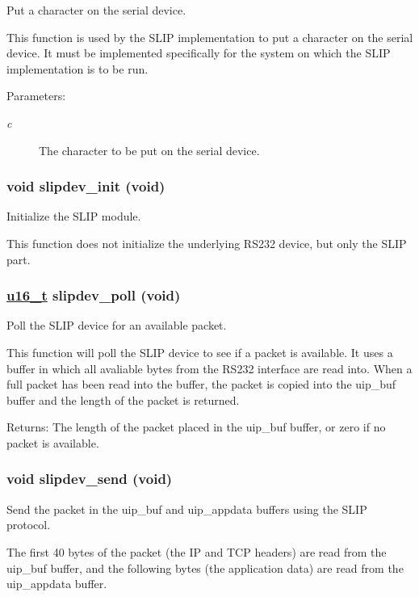Put a character on the serial device. 

This function is used by the SLIP implementation to put a character on the serial device. It must be implemented specifically for the system on which the SLIP implementation is to be run.

\begin{Desc}
\item[Parameters:]
\begin{description}
\item[{\em c}]The character to be put on the serial device. \end{description}
\end{Desc}
\hypertarget{a00068_g24cdb292a83c88750cdc170546038d0d}{
\subsubsection[slipdev\_\-init]{\setlength{\rightskip}{0pt plus 5cm}void slipdev\_\-init (void)}}
\label{a00068_g24cdb292a83c88750cdc170546038d0d}


Initialize the SLIP module. 

This function does not initialize the underlying RS232 device, but only the SLIP part. \hypertarget{a00068_g0fba24e31e1974adfdae516ddadb5ee2}{
\subsubsection[slipdev\_\-poll]{\setlength{\rightskip}{0pt plus 5cm}\hyperlink{a00070_gfc6499c1f28697aa3bfc2804d496fd11}{u16\_\-t} slipdev\_\-poll (void)}}
\label{a00068_g0fba24e31e1974adfdae516ddadb5ee2}


Poll the SLIP device for an available packet. 

This function will poll the SLIP device to see if a packet is available. It uses a buffer in which all avaliable bytes from the RS232 interface are read into. When a full packet has been read into the buffer, the packet is copied into the uip\_\-buf buffer and the length of the packet is returned.

\begin{Desc}
\item[Returns:]The length of the packet placed in the uip\_\-buf buffer, or zero if no packet is available. \end{Desc}
\hypertarget{a00068_gf8c1cf09a7c592ed1ea6b8595aa5f162}{
\subsubsection[slipdev\_\-send]{\setlength{\rightskip}{0pt plus 5cm}void slipdev\_\-send (void)}}
\label{a00068_gf8c1cf09a7c592ed1ea6b8595aa5f162}


Send the packet in the uip\_\-buf and uip\_\-appdata buffers using the SLIP protocol. 

The first 40 bytes of the packet (the IP and TCP headers) are read from the uip\_\-buf buffer, and the following bytes (the application data) are read from the uip\_\-appdata buffer. 